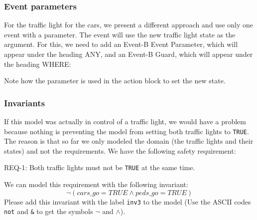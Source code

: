 \subsubsection{Event parameters}

For the traffic light for the cars, we present a different approach and use only one event with a parameter.  The event will use the new traffic light state as the argument. For this, we need to add an Event-B Event Parameter, which will appear under the heading \textsf{ANY}, and an Event-B Guard, which will appear under the heading \textsf{WHERE}: 


Note how the parameter is used in the action block to set the new state.

\subsubsection{Invariants}
\label{tutorial:invariants}

If this model was actually in control of a traffic light, we would have a problem because nothing is preventing the model from setting both traffic lights to \texttt{TRUE}.  The reason is that so far we only modeled the domain (the traffic lights and their states) and not the requirements.  We have the following safety requirement:

\begin{center}REQ-1: Both traffic lights must not be \texttt{TRUE} at the same time.\end{center}

We can model this requirement with the following invariant:
\[
\lnot  (cars\_go = TRUE \land  peds\_go = TRUE)
\]
Please add this invariant with the label \texttt{inv3} to the model (Use the ASCII codes \texttt{not} and \texttt{\&} to get the symbols $\lnot$ and $\land$).

